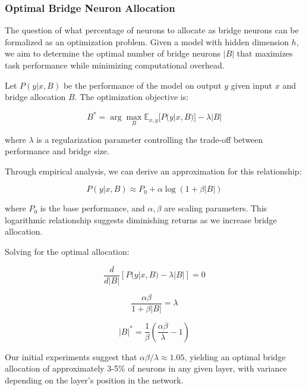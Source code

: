 \documentclass[9pt,a4paper,twocolumn,twoside]{tau-class/tau}
\begin{document}
\subsubsection{Optimal Bridge Neuron Allocation}

    The question of what percentage of neurons to allocate as bridge neurons can be formalized as an optimization problem. Given a model with hidden dimension $h$, we aim to determine the optimal number of bridge neurons $|B|$ that maximizes task performance while minimizing computational overhead.

    Let $P(y|x,B)$ be the performance of the model on output $y$ given input $x$ and bridge allocation $B$. The optimization objective is:

    \begin{equation}
        B^* = \arg\max_B \mathbb{E}_{x,y} [P(y|x,B)] - \lambda |B|
    \end{equation}

    where $\lambda$ is a regularization parameter controlling the trade-off between performance and bridge size.

    Through empirical analysis, we can derive an approximation for this relationship:

    \begin{equation}
        P(y|x,B) \approx P_0 + \alpha \log(1 + \beta |B|)
    \end{equation}

    where $P_0$ is the base performance, and $\alpha, \beta$ are scaling parameters. This logarithmic relationship suggests diminishing returns as we increase bridge allocation.

    Solving for the optimal allocation:

    \begin{equation}
        \frac{d}{d|B|} [P(y|x,B) - \lambda |B|] = 0
    \end{equation}

    \begin{equation}
        \frac{\alpha\beta}{1 + \beta |B|} = \lambda
    \end{equation}

    \begin{equation}
        |B|^* = \frac{1}{\beta}(\frac{\alpha\beta}{\lambda} - 1)
    \end{equation}

    Our initial experiments suggest that $\alpha\beta/\lambda \approx 1.05$, yielding an optimal bridge allocation of approximately 3-5\% of neurons in any given layer, with variance depending on the layer's position in the network.
\end{document}
